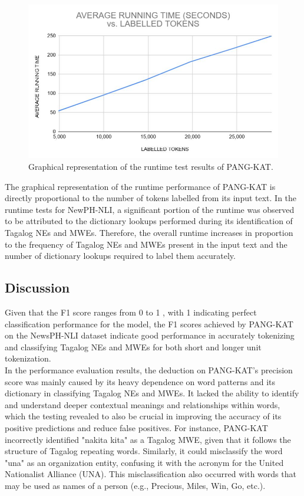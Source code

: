 \documentclass[journal]{./IEEE/IEEEtran}
\begin{document}
\begin{figure}[H]
    \centering
    \includegraphics[scale=0.51]{images/Runtime Test Graph.JPG}
    \captionsetup{justification=centering}
    \caption{Graphical representation of the runtime test results of PANG-KAT.}
\end{figure}

The graphical representation of the runtime performance of PANG-KAT is directly proportional to the number of tokens labelled from its input text. In the runtime tests for NewPH-NLI, a significant portion of the runtime was observed to be attributed to the dictionary lookups performed during its identification of Tagalog NEs and MWEs. Therefore, the overall runtime increases in proportion to the frequency of Tagalog NEs and MWEs present in the input text and the number of dictionary lookups required to label them accurately.

\subsection {Discussion}

Given that the F1 score ranges from 0 to 1 {\cite{perEvalMetrics}}, with 1 indicating perfect classification performance for the model, the F1 scores achieved by PANG-KAT on the NewsPH-NLI dataset indicate good performance in accurately tokenizing and classifying Tagalog NEs and MWEs for both short and longer unit tokenization. \\

In the performance evaluation results, the deduction on PANG-KAT’s precision score was mainly caused by its heavy dependence on word patterns and its dictionary in classifying Tagalog NEs and MWEs. It lacked the ability to identify and understand deeper contextual meanings and relationships within words, which the testing revealed to also be crucial in improving the accuracy of its positive predictions and reduce false positives. For instance, PANG-KAT incorrectly identified "nakita kita" as a Tagalog MWE, given that it follows the structure of Tagalog repeating words. Similarly, it could misclassify the word "una" as an organization entity, confusing it with the acronym for the United Nationalist Alliance (UNA). This misclassification also occurred with words that may be used as names of a person (e.g., Precious, Miles, Win, Go, etc.). \\
\end{document}

